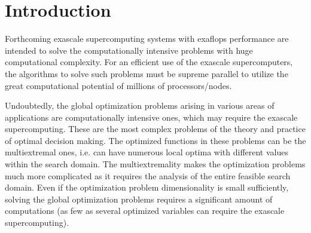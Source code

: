 \documentclass[12pt]{amsart}
\author{Strongin R.G., Gergel V.P., Barkalov K.A., Sysoyev A.V.}
\begin{document}
\maketit

\address{Lobachevsky State University of Nizhni Novgorod}




{


}


\section{Introduction}

Forthcoming exascale supercomputing systems with exaflops performance are intended to solve the computationally intensive problems with huge computational complexity. For an efficient use of the exascale supercomputers, the algorithms to solve such problems must be supreme parallel to utilize the great computational potential of millions of processors/nodes.

Undoubtedly, the global optimization problems arising in various areas of applications are computationally intensive ones, which may require the exascale supercomputing. These are the most complex problems of the theory and practice of optimal decision making. The optimized functions in these problems can be the multiextremal ones, i.e. can have numerous local optima with different values within the search domain. The multiextremality makes the optimization problems much more complicated as it requires the analysis of the entire feasible search domain. Even if the optimization problem dimensionality is small sufficiently, solving the global optimization problems requires a significant amount of computations (as few as several optimized variables can require the exascale supercomputing).
\end{document}
